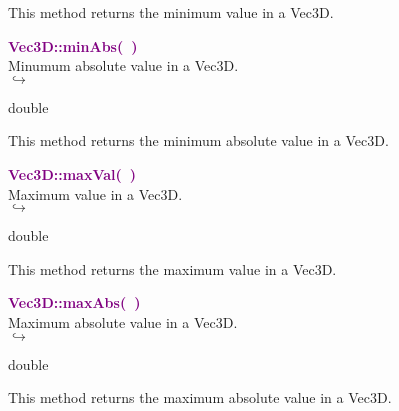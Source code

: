 This method returns the minimum value in a Vec3D.

\textcolor{purple}{\textbf{Vec3D::minAbs(~)}}\label{Vec3D::minAbs()}\\
Minumum absolute value in a Vec3D.\\ \hspace*{5mm}$\hookrightarrow$
\vspace*{-2em}\begin{tcolorbox}[grow to left by=-1cm, width=\textwidth-1cm,myArgs,tabularx={l|R}]
double
\end{tcolorbox}

This method returns the minimum absolute value in a Vec3D.

\textcolor{purple}{\textbf{Vec3D::maxVal(~)}}\label{Vec3D::maxVal()}\\
Maximum value in a Vec3D.\\ \hspace*{5mm}$\hookrightarrow$
\vspace*{-2em}\begin{tcolorbox}[grow to left by=-1cm, width=\textwidth-1cm,myArgs,tabularx={l|R}]
double
\end{tcolorbox}

This method returns the maximum value in a Vec3D.

\textcolor{purple}{\textbf{Vec3D::maxAbs(~)}}\label{Vec3D::maxAbs()}\\
Maximum absolute value in a Vec3D.\\ \hspace*{5mm}$\hookrightarrow$
\vspace*{-2em}\begin{tcolorbox}[grow to left by=-1cm, width=\textwidth-1cm,myArgs,tabularx={l|R}]
double
\end{tcolorbox}

This method returns the maximum absolute value in a Vec3D.

